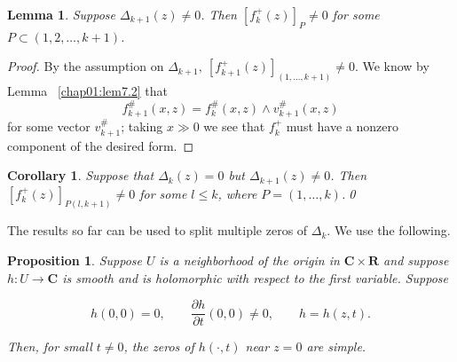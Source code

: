 \documentclass{surv-l}
\theoremstyle{plain}
\newtheorem{cor}[theorem]{Corollary}
\newtheorem{prop}[theorem]{Proposition}
\newtheorem{lemma}[theorem]{Lemma}
\theoremstyle{definition}
\numberwithin{equation}{chapter}
\begin{document}
\setcounter{theorem}{8}
\begin{lemma}\label{lem19.9}
Suppose $\Delta_{k+1}(z)\neq 0$.  Then $[f_{k}^{+}(z)]_{P}\neq 0$  for some $ P\subset (1, 2,\ldots, k+1)$.
\end{lemma}
\begin{proof}
By the assumption on $\Delta_{k+1},\ [f_{k+1}^{+}(z)]_{(1,\ldots,k+1)}\neq 0$. We know by Lemma ~\ref{chap01:lem7.2} that
\begin{equation*}
f_{k+1}^{\#}(x,z)=f_{k}^{\#}(x,z) \wedge v_{k+1}^{\#}(x, z)
\end{equation*}
for some vector $v_{k+1}^{\#}$; taking $x\gg 0$ we see that $f_{k}^{+}$ must have a nonzero component of the desired form.
\end{proof}
\begin{cor}\label{coro19.10}
Suppose that $\Delta_{k}(z)=0$ but $\Delta_{k+1}(z)\neq 0$.   Then $[f_{k}^{+}(z)]_{P(l,k+1)}\neq 0$ for some $l\leq k$, where $P=(1,\ldots,k)$.\qed
\end{cor}
The results so far can be used to split multiple zeros of $\Delta_{k}$.  We use the following.
\begin{prop}\label{prop19.11}
Suppose $U$  is a neighborhood of the origin in $\mathbf{C}\times{\mathbf{R}}$ and suppose $h:U\rightarrow \mathbf{C}$ is smooth and is holomorphic with respect to the first variable. Suppose

\begin{equation*}
h(0,0)=0,\qquad \frac{\partial h}{\partial t}(0,0)\neq 0,\qquad h=h(z,t).
\end{equation*}

Then, for small $t\neq 0$, the zeros of $h(\cdot,t)$ near $z=0$ are simple.
\end{prop}
\end{document}
